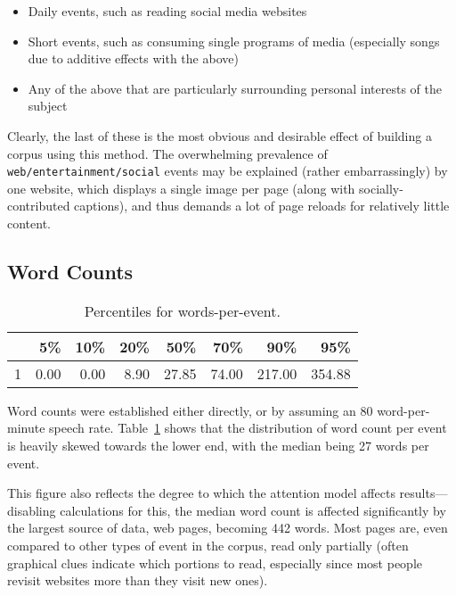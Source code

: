 \begin{itemize}
    \item Daily events, such as reading social media websites
    \item Short events, such as consuming single programs of media (especially songs due to additive effects with the above)
    \item Any of the above that are particularly surrounding personal interests of the subject
\end{itemize}

Clearly, the last of these is the most obvious and desirable effect of building a corpus using this method.  The overwhelming prevalence of \texttt{web/entertainment/social} events may be explained (rather embarrassingly) by one website, which displays a single image per page (along with socially-contributed captions), and thus demands a lot of page reloads for relatively little content.








\subsection{Word Counts}

\begin{table}[ht]
    \centering
    \begin{tabular}{rrrrrrrr}
        \hline
        & 5\% & 10\% & 20\% & 50\% & 70\% & 90\% & 95\% \\ 
        \hline
        1 & 0.00 & 0.00 & 8.90 & 27.85 & 74.00 & 217.00 & 354.88 \\ 
        \hline
    \end{tabular}
    \caption{Percentiles for words-per-event.}
    \label{table:personal:wordsperevent}
\end{table}

Word counts were established either directly, or by assuming an 80 word-per-minute speech rate.  Table~\ref{table:personal:wordsperevent} shows that the distribution of word count per event is heavily skewed towards the lower end, with the median being 27 words per event.

This figure also reflects the degree to which the attention model affects results---disabling calculations for this, the median word count is affected significantly by the largest source of data, web pages, becoming 442 words.  Most pages are, even compared to other types of event in the corpus, read only partially (often graphical clues indicate which portions to read, especially since most people revisit websites more than they visit new ones).









